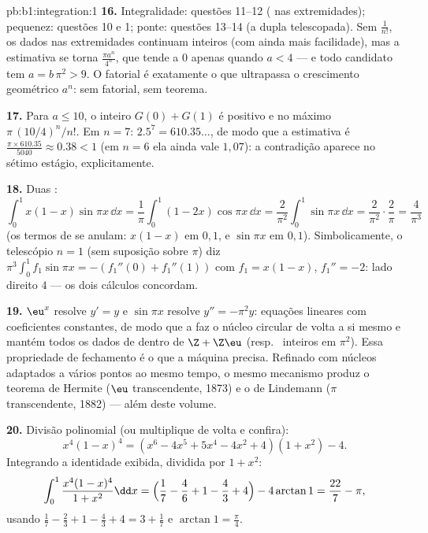 \begin{solution}{pb:b1:integration:1}
\textbf{16.} Integralidade: questões 11--12 ( nas
extremidades); pequenez: questões 10 e 1; ponte: questões
13--14 (a dupla  telescopada). Sem
$\frac{1}{n!}$, os dados nas extremidades continuam inteiros (com ainda
mais facilidade), mas a estimativa se torna $\frac{\pi a^n}{4^n}$, que
tende a $0$ apenas quando $a < 4$ --- e todo candidato tem $a =
b\,\pi^2 > 9$. O fatorial é exatamente o que ultrapassa o
crescimento geométrico $a^n$: sem fatorial, sem teorema.

\textbf{17.} Para $a \leq 10$, o inteiro $G(0) + G(1)$ é
positivo e no máximo $\pi\,(10/4)^n/n!$. Em $n = 7$:
$2.5^7 = 610.35\dots$, de modo que a estimativa é $\frac{\pi \times
610.35}{5040} \approx 0.38 < 1$ (em $n = 6$ ela ainda vale
$1{,}07$): a contradição aparece no sétimo estágio,
explicitamente.

\textbf{18.} Duas :
\[
\int_0^1 x(1-x)\sin\pi x\,\dd x
= \frac1\pi\int_0^1 (1 - 2x)\cos\pi x\,\dd x
= \frac{2}{\pi^2}\int_0^1 \sin\pi x\,\dd x
= \frac{2}{\pi^2}\cdot\frac{2}{\pi} = \frac{4}{\pi^3}
\]
(os termos de  se anulam: $x(1-x)$ em $0, 1$, e $\sin\pi x$
em $0, 1$). Simbolicamente, o telescópio $n = 1$ (sem suposição
sobre $\pi$) diz $\pi^3\int_0^1 f_1\sin\pi x = -(f_1''(0) +
f_1''(1))$ com $f_1 = x(1 - x)$, $f_1'' = -2$: lado direito $4$
--- os dois cálculos concordam.

\textbf{19.} $\eu^x$ resolve $y' = y$ e $\sin\pi x$ resolve
$y'' = -\pi^2 y$: equações lineares com coeficientes constantes,
de modo que a  faz o núcleo circular de volta a si
mesmo e mantém todos os dados de  dentro de $\Z + \Z\eu$ (resp.\
 inteiros em $\pi^2$). Essa propriedade de fechamento é o que
a máquina precisa. Refinado com núcleos adaptados a vários pontos ao
mesmo tempo, o mesmo mecanismo produz o teorema de Hermite ($\eu$
transcendente, 1873) e o de Lindemann ($\pi$ transcendente,
1882) --- além deste volume.

\textbf{20.} Divisão polinomial (ou multiplique de volta e confira):
\[
x^4(1-x)^4 = (x^6 - 4x^5 + 5x^4 - 4x^2 + 4)(1 + x^2) - 4 .
\]
Integrando a identidade exibida, dividida por $1 + x^2$:
\[
\int_0^1 \frac{x^4(1-x)^4}{1+x^2}\dd x
= \Bigl(\frac17 - \frac46 + 1 - \frac43 + 4\Bigr)
- 4\arctan 1
= \frac{22}{7} - \pi ,
\]
usando $\frac17 - \frac23 + 1 - \frac43 + 4 = 3 + \frac17$ e
$\arctan 1 = \frac\pi4$.


\end{solution}
